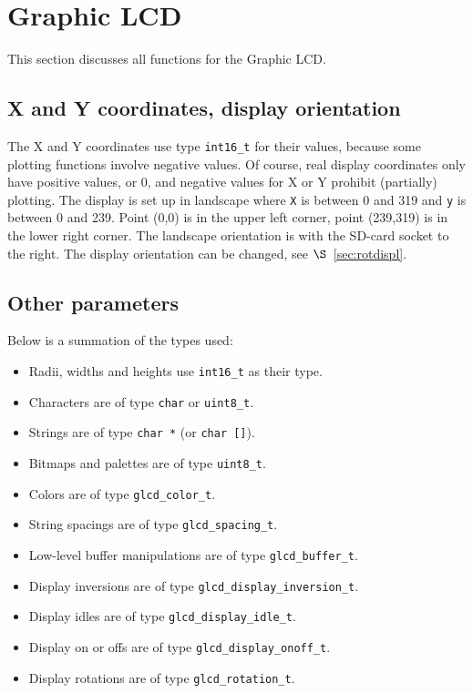 \documentclass[12pt]{article}
\begin{document}
\section{Graphic LCD}
This section discusses all functions for the Graphic LCD.

\subsection{X and Y coordinates, display orientation}
The X and Y coordinates use type \lstinline|int16_t| for their values, because some plotting functions involve negative values. Of course, real display coordinates only have positive values, or 0, and negative values for X or Y prohibit (partially) plotting. The display is set up in landscape where \lstinline|X| is between 0 and 319 and \lstinline|y| is between 0 and 239. Point (0,0) is in the upper left corner,
point (239,319) is in the lower right corner. The landscape orientation is with the SD-card socket to the right.
The display orientation can be changed, see $\S$~\ref{sec:rotdispl}.

\subsection{Other parameters}
Below is a summation of the types used:

\begin{itemize}
\item Radii, widths and heights use \lstinline|int16_t| as their type.
\item Characters are of type \lstinline|char| or \lstinline|uint8_t|.
\item Strings are of type \lstinline|char *| (or \lstinline|char []|).
\item Bitmaps and palettes are of type \lstinline|uint8_t|.
\item Colors are of type \lstinline|glcd_color_t|.
\item String spacings are of type \lstinline|glcd_spacing_t|.
\item Low-level buffer manipulations are of type \lstinline|glcd_buffer_t|.
\item Display inversions are of type \lstinline|glcd_display_inversion_t|.
\item Display idles are of type \lstinline|glcd_display_idle_t|.
\item Display on or offs are of type \lstinline|glcd_display_onoff_t|.
\item Display rotations are of type \lstinline|glcd_rotation_t|.
\end{itemize}
\end{document}
